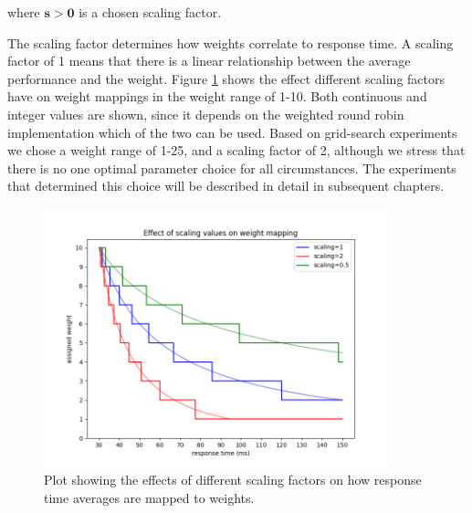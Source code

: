 where $\mathbf{s > 0}$ is a chosen scaling factor.



The scaling factor determines how weights correlate to response time. A scaling factor of 1 means that there is a linear relationship between the average performance and the weight.
Figure \ref{fig:weight_mapping_example} shows the effect different scaling factors have on weight mappings in the weight range of 1-10. Both continuous and integer values are shown, since it depends on the weighted round robin implementation which of the two can be used.
Based on grid-search experiments we chose a weight range of 1-25, and a scaling factor of 2, although we stress that there is no one optimal parameter choice for all circumstances.
The experiments that determined this choice will be described in detail in subsequent chapters.


\begin{figure}
    \centering
    \includegraphics[width=10cm]{graphics/graphs/weight_mapping_scaling_example.png}
    \caption{Plot showing the effects of different scaling factors on how response time averages are mapped to weights.}
    \label{fig:weight_mapping_example}
\end{figure}


